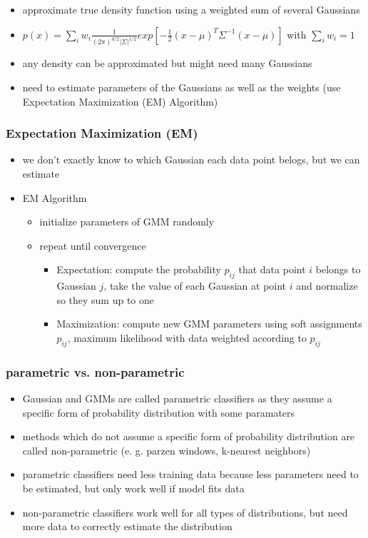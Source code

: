 \documentclass[paper=a4, fontsize=11pt]{scrartcl} %
\numberwithin{equation}{section} %
\numberwithin{figure}{section} %
\numberwithin{table}{section} %
\begin{document}
\begin{itemize}
\item approximate true density function using a weighted sum of several Gaussians
\item $p(x) = \sum\limits_i w_i\frac{1}{(2\pi)^{d/2}|\Sigma|^{1/2}} exp[-\frac{1}{2}(x-\mu)^T \Sigma^{-1} (x-\mu)]$ with $\sum\limits_i w_i = 1$
\item any density can be approximated but might need many Gaussians
\item need to estimate parameters of the Gaussians as well as the weights (use Expectation Maximization (EM) Algorithm)
\end{itemize}

\subsubsection{Expectation Maximization (EM)}

\begin{itemize}
\item we don't exactly know to which Gaussian each data point belogs, but we can estimate
\item EM Algorithm
\begin{itemize}
\item initialize parameters of GMM randomly
\item repeat until convergence
\begin{itemize}
\item Expectation: compute the probability $p_{ij}$ that data point $i$ belongs to Gaussian $j$, take the value of each Gaussian at point $i$ and normalize so they sum up to one
\item Maximization: compute new GMM parameters using soft assignments $p_{ij}$, maximum likelihood with data weighted according to $p_{ij}$
\end{itemize}
\end{itemize}
\end{itemize}

\subsubsection{parametric vs. non-parametric}

\begin{itemize}
\item Gaussian and GMMs are called parametric classifiers as they assume a specific form of probability distribution with some paramaters
\item methods which do not assume a specific form of probability distribution are called non-parametric (e. g. parzen windows, k-nearest neighbors)
\item parametric classifiers need less training data because less parameters need to be estimated, but only work well if model fits data
\item non-parametric classifiers work well for all types of distributions, but need more data to correctly estimate the distribution
\end{itemize}
\end{document}
